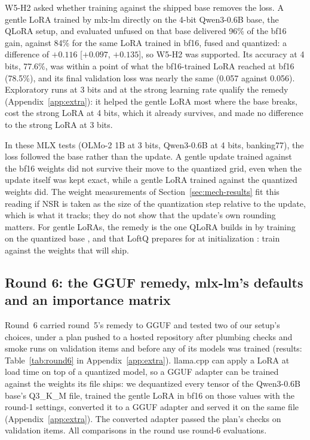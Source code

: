 \documentclass[10pt]{article}
\begin{document}
W5-H2 asked whether training against the shipped base removes the loss. A gentle LoRA trained by mlx-lm directly on the 4-bit Qwen3-0.6B base, the QLoRA setup, and evaluated unfused on that base delivered 96\% of the bf16 gain, against 84\% for the same LoRA trained in bf16, fused and quantized: a difference of $+0.116$ [$+0.097$, $+0.135$], so W5-H2 was supported. Its accuracy at 4 bits, 77.6\%, was within a point of what the bf16-trained LoRA reached at bf16 (78.5\%), and its final validation loss was nearly the same (0.057 against 0.056). Exploratory runs at 3 bits and at the strong learning rate qualify the remedy (Appendix~\ref{app:extra}): it helped the gentle LoRA most where the base breaks, cost the strong LoRA at 4 bits, which it already survives, and made no difference to the strong LoRA at 3 bits.

In these MLX tests (OLMo-2 1B at 3 bits, Qwen3-0.6B at 4 bits, banking77), the loss followed the base rather than the update. A gentle update trained against the bf16 weights did not survive their move to the quantized grid, even when the update itself was kept exact, while a gentle LoRA trained against the quantized weights did. The weight measurements of Section~\ref{sec:mech-results} fit this reading if NSR is taken as the size of the quantization step relative to the update, which is what it tracks; they do not show that the update's own rounding matters. For gentle LoRAs, the remedy is the one QLoRA builds in by training on the quantized base \citep{dettmers2023qlora}, and that LoftQ prepares for at initialization \citep{li2023loftq}: train against the weights that will ship.

\subsection{Round 6: the GGUF remedy, mlx-lm's defaults and an importance matrix}
\label{sec:round6}

Round~6 carried round~5's remedy to GGUF and tested two of our setup's choices, under a plan pushed to a hosted repository after plumbing checks and smoke runs on validation items and before any of its models was trained (results: Table~\ref{tab:round6} in Appendix~\ref{app:extra}). llama.cpp can apply a LoRA at load time on top of a quantized model, so a GGUF adapter can be trained against the weights its file ships: we dequantized every tensor of the Qwen3-0.6B base's Q3\_K\_M file, trained the gentle LoRA in bf16 on those values with the round-1 settings, converted it to a GGUF adapter and served it on the same file (Appendix~\ref{app:extra}). The converted adapter passed the plan's checks on validation items. All comparisons in the round use round-6 evaluations.
\end{document}
